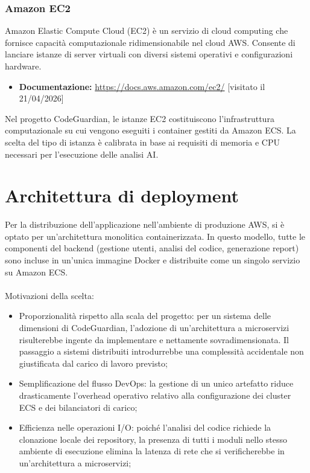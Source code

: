 \documentclass[a4paper, 11pt]{article}
\begin{document}
\subsubsection{Amazon EC2}
Amazon Elastic Compute Cloud (EC2) è un servizio di cloud computing che fornisce capacità computazionale ridimensionabile nel cloud AWS\@. Consente di lanciare istanze di server virtuali con diversi sistemi operativi e configurazioni hardware.
\begin{itemize}
  \item \textbf{Documentazione:} \url{https://docs.aws.amazon.com/ec2/} [visitato il 21/04/2026]
\end{itemize}
Nel progetto CodeGuardian, le istanze EC2 costituiscono l'infrastruttura computazionale su cui vengono eseguiti i container gestiti da Amazon ECS\@. La scelta del tipo di istanza è calibrata in base ai requisiti di memoria e CPU necessari per l'esecuzione delle analisi AI\@.


\section{Architettura di deployment}
Per la distribuzione dell'applicazione nell'ambiente di produzione AWS, si è optato per un'architettura monolitica containerizzata. In questo modello, tutte le componenti del backend (gestione utenti, analisi del codice, generazione report) sono incluse in un'unica immagine Docker e distribuite come un singolo servizio su Amazon ECS.\\ \\
Motivazioni della scelta:
\begin{itemize}
  \item Proporzionalità rispetto alla scala del progetto: per un sistema delle dimensioni di CodeGuardian, l'adozione di un'architettura a microservizi risulterebbe ingente da implementare e nettamente sovradimensionata. Il passaggio a sistemi distribuiti introdurrebbe una complessità accidentale non giustificata dal carico di lavoro previsto;
  \item Semplificazione del flusso DevOps: la gestione di un unico artefatto riduce drasticamente l'overhead operativo relativo alla configurazione dei cluster ECS e dei bilanciatori di carico;
  \item Efficienza nelle operazioni I/O: poiché l'analisi del codice richiede la clonazione locale dei repository, la presenza di tutti i moduli nello stesso ambiente di esecuzione elimina la latenza di rete che si verificherebbe in un'architettura a microservizi;
\end{itemize}
\end{document}
